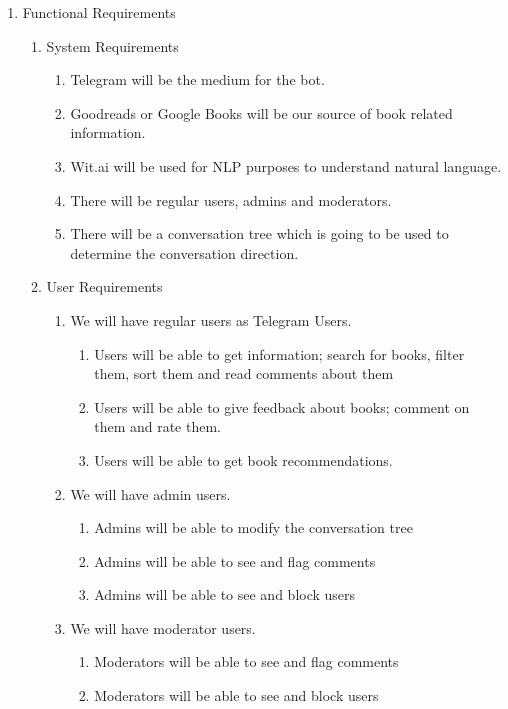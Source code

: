 \documentclass[a4paper]{article}
\begin{document}
\begin{enumerate}
\item Functional Requirements
  \begin{enumerate}
  \item System Requirements
    \begin{enumerate}
    \item Telegram will be the medium for the bot.
    \item Goodreads or Google Books will be our source of book related information.
    \item Wit.ai will be used for NLP purposes to understand natural language.
    \item There will be regular users, admins and moderators.
    \item There will be a conversation tree which is going to be used to determine the conversation direction.
    \end{enumerate}
  \item User Requirements
    \begin{enumerate}
    \item We will have regular users as Telegram Users.
    	\begin{enumerate}
        \item Users will be able to get information; search for books, filter them, sort them and read comments about them
        \item Users will be able to give feedback about books; comment on them and rate them.
        \item Users will be able to get book recommendations.
        \end{enumerate}
    \item We will have admin users.
        \begin{enumerate}
        \item Admins will be able to modify the conversation tree
        \item Admins will be able to see and flag comments
        \item Admins will be able to see and block users
        \end{enumerate}
    \item We will have moderator users.
        \begin{enumerate}
        \item Moderators will be able to see and flag comments
        \item Moderators will be able to see and block users
        \end{enumerate}

\end{enumerate}
\end{enumerate}
\end{enumerate}
\end{document}
